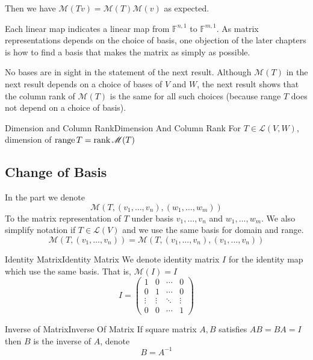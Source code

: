 \documentclass[../main.tex]{subfiles}
\begin{document}
Then we have $\mathscr{M}(Tv) = \mathscr{M}(T)\mathscr{M}(v)$ as expected.

\begin{remark}
Each linear map indicates a linear map from $\mathbb{F}^{n,1}$ to $\mathbb{F}^{m,1}$. As matrix representations depends on  the choice of basis, one objection of the later chapters is how to find a basis that makes the matrix as simply as possible.
\end{remark}

No bases are in sight in the statement of the next result. Although $\mathscr{M}(T)$ in the next result depends on a choice of bases of $V$ and $W$, the next result
shows that the column rank of $\mathscr{M}(T)$ is the same for all such choices (because
range $T$ does not depend on a choice of basis).

\begin{theorem}{Dimension and Column Rank}{Dimension And Column Rank}
For $T\in \mathscr{L}(V,W)$, dimension of $\operatorname{range} T = \operatorname{rank} \mathscr{M}(T)$
\end{theorem}

\subsection{Change of Basis}

In the part we denote
\begin{equation}
\mathscr{M}(T,(v_1, \ldots ,v_n),(w_1, \ldots ,w_m))
\end{equation}
To the matrix representation of $T$ under basis $v_1, \ldots ,v_n$ and $w_1, \ldots ,w_m$. We also simplify notation if $T\in \mathscr{L}(V)$ and we use the same basis for domain and range.
\begin{equation*}
\mathscr{M}(T,(v_1, \ldots ,v_n)) = \mathscr{M}(T,(v_1, \ldots ,v_n), (v_1, \ldots ,v_n))
\end{equation*}

\begin{definition}{Identity Matrix}{Identity Matrix}
We denote identity matrix $I$ for the identity map which use the same basis. That is, $\mathscr{M}(I)=I$
\begin{equation}
I=
\begin{pmatrix}
	1&0&\cdots &0\\
	0&1&\cdots &0\\
	\vdots &\vdots &\ddots &\vdots \\
	0&0&\cdots &1
\end{pmatrix}
\end{equation}
\end{definition}
\begin{definition}{Inverse of Matrix}{Inverse Of Matrix}
If square matrix $A,B$ satisfies $AB=BA=I$ then $B$ is the inverse of $A$, denote
\begin{equation*}
B=A ^{-1}
\end{equation*}
\end{definition}
\end{document}
